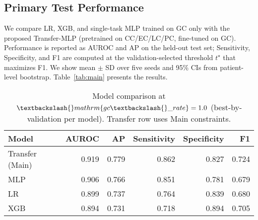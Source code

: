 \documentclass[journal,article,submit,pdftex,moreauthors]{Definitions/mdpi}
\begin{document}
\subsection{Primary Test Performance}
We compare LR, XGB, and single-task MLP trained on GC only with the proposed Transfer-MLP (pretrained on CC/EC/LC/PC, fine-tuned on GC).
Performance is reported as AUROC and AP on the held-out test set;
Sensitivity, Specificity, and F1 are computed at the validation-selected threshold $t^\star$ that maximizes F1. %
We show mean $\pm$ SD over five seeds and 95\% CIs from patient-level bootstrap.
Table~\ref{tab:main} presents the results.

\begin{table}[t]
\centering
\begin{tabular}{lrrrrr}
\toprule
Model & AUROC & AP & Sensitivity & Specificity & F1 \\
\midrule
Transfer (Main) & 0.919 & 0.779 & 0.862 & 0.827 & 0.724 \\
MLP & 0.906 & 0.766 & 0.851 & 0.781 & 0.679 \\
LR & 0.899 & 0.737 & 0.764 & 0.839 & 0.680 \\
XGB & 0.894 & 0.731 & 0.718 & 0.894 & 0.705 \\
\bottomrule
\end{tabular}

\caption{Model comparison at $\textbackslash\{\}mathrm\{gc\textbackslash\{\}\_rate\}=1.0$ (best-by-validation per model). Transfer row uses Main constraints.}
\label{tab:model-compare-gc1}
\end{table}
\end{document}
